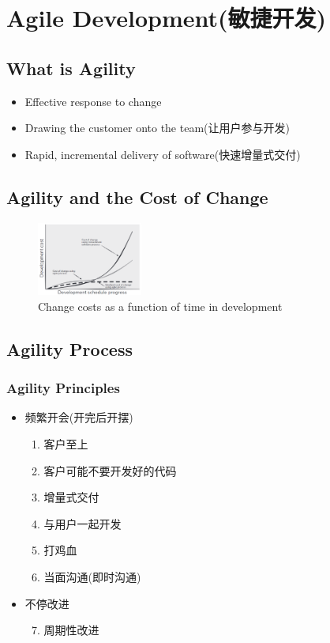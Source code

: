 \newpage
\section{Agile Development(敏捷开发)}
\subsection{What is Agility}
\begin{itemize}
    \item Effective response to change
    \item Drawing the customer onto the team(让用户参与开发)
    \item Rapid, incremental delivery of software(快速增量式交付)
\end{itemize}

\subsection{Agility and the Cost of Change}
\begin{figure}[!htb]
    \centering
    \includegraphics[width=0.309\textwidth]{pic/SE3/Change costs as a function of time in development}
    \caption{Change costs as a function of time in development}
\end{figure}

\subsection{Agility Process}

\subsubsection{Agility Principles}
\begin{itemize}
    \item 频繁开会(开完后开摆)
    \begin{enumerate}
        \item 客户至上
        \item 客户可能不要开发好的代码
        \item 增量式交付
        \item 与用户一起开发
        \item 打鸡血
        \item 当面沟通(即时沟通)
    \end{enumerate}
    \item 不停改进
    \begin{enumerate}
        \setcounter{enumi}{6}
        \item 周期性改进
    \end{enumerate}
\end{itemize}

